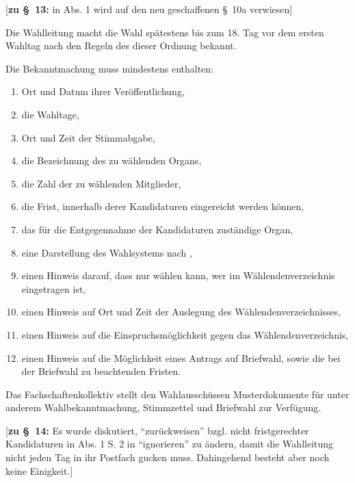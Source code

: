 \documentclass[%
draft,%
multilinesections%
]{fswo}
\newcommand\bemFr[1] {{\color{Red}[#1]}}
\newcommand\bemFr[1]{}%
\begin{document}
\bemFr{\textbf{zu \S~13:} in Abs. 1 wird auf den neu geschaffenen \S~10a verwiesen}
\begin{contract}
Die Wahlleitung macht die Wahl spätestens bis zum 18. Tag vor dem ersten Wahltag nach den Regeln des  dieser Ordnung bekannt.

Die Bekanntmachung muss mindestens enthalten:
\begin{enumerate}
\item Ort und Datum ihrer Veröffentlichung,
\item die Wahltage,
\item Ort und Zeit der Stimmabgabe,
\item die Bezeichnung des zu wählenden Organs,
\item die Zahl der zu wählenden Mitglieder,
\item die Frist, innerhalb derer Kandidaturen eingereicht werden können,
\item das für die Entgegennahme der Kandidaturen zuständige Organ,
\item eine Darstellung des Wahlsystems nach ,
\item einen Hinweis darauf, dass nur wählen kann, wer im Wählendenverzeichnis eingetragen ist,
\item einen Hinweis auf Ort und Zeit der Auslegung des Wählendenverzeichnisses,
\item einen Hinweis auf die Einspruchsmöglichkeit gegen das Wählendenverzeichnis,
\item einen Hinweis auf die Möglichkeit eines Antrags auf Briefwahl, sowie die bei der Briefwahl zu beachtenden Fristen.
\end{enumerate}

Das Fachschaftenkollektiv stellt den Wahlausschüssen Musterdokumente für unter anderem Wahlbekanntmachung, Stimmzettel und Briefwahl zur Verfügung.
\end{contract}

\bemFr{\textbf{zu \S~14:} Es wurde diskutiert, \enquote{zurückweisen} bzgl. nicht fristgerechter Kandidaturen in Abs. 1 S. 2 in \enquote{ignorieren} zu ändern, damit die Wahlleitung nicht jeden Tag in ihr Postfach gucken muss.
Dahingehend besteht aber noch keine Einigkeit.}
\end{document}
